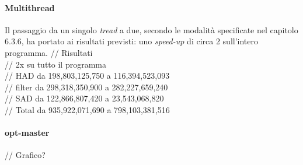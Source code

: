 \paragraph{Multithread \\}
  Il passaggio da un singolo \emph{tread} a due, secondo le modalità 
  specificate nel capitolo 6.3.6, ha portato ai risultati previsti: uno 
  \emph{speed-up} di circa 2 sull'intero programma.
  // Risultati \\
  // 2x su tutto il programma\\
  
// HAD    da 198,803,125,750 a 116,394,523,093 \\
// filter da 298,318,350,900 a 282,227,659,240 \\
// SAD    da 122,866,807,420 a 23,543,068,820 \\
// Total  da 935,922,071,690 a 798,103,381,516 \\

\paragraph{opt-master \\}

// Grafico? \\